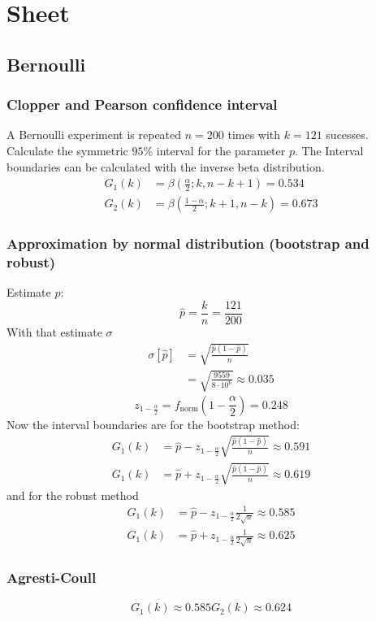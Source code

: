 \section{Sheet}
\subsection{Bernoulli}
\subsubsection{Clopper and Pearson confidence interval}
A Bernoulli experiment is repeated $n=200$ times with $k=121$ sucesses. Calculate the symmetric $95\%$ interval
for the  parameter $p$.
The Interval boundaries can be calculated with the inverse beta distribution.
\begin{align}
    G_1\left(k\right)&=\beta\left(\frac{\alpha}{2};k,n-k+1\right)=0.534
    \\G_2\left(k\right)&=\beta\left(\frac{1-\alpha}{2};k+1,n-k\right)=0.673
\end{align}
\subsubsection{Approximation by normal distribution (bootstrap and robust)}
Estimate $p$:
\begin{equation}
    \hat{p}=\frac{k}{n}=\frac{121}{200}
\end{equation}
With that estimate $\sigma$
\begin{align}
    \sigma\left[\hat{p}\right]&=\sqrt{\frac{\hat{p}\left(1-\hat{p}\right)}{n}}
    \\&=\sqrt{\frac{9559}{8\cdot 10^6}}\approx 0.035
\end{align}
\begin{equation}
    z_{1-\frac{\alpha}{2}}=f_{\text{norm}}\left(1-\frac{\alpha}{2}\right)=0.248
\end{equation}
Now the interval boundaries are for the bootstrap method:
\begin{align}
    G_1\left(k\right)&=\hat{p}-z_{1-\frac{\alpha}{2}}\sqrt{\frac{\hat{p}\left(1-\hat{p}\right)}{n}}\approx 0.591
    \\G_1\left(k\right)&=\hat{p}+z_{1-\frac{\alpha}{2}}\sqrt{\frac{\hat{p}\left(1-\hat{p}\right)}{n}}\approx 0.619
\end{align}
and for the robust method
\begin{align}
    G_1\left(k\right)&=\hat{p}-z_{1-\frac{\alpha}{2}}\frac{1}{2\sqrt{n}}\approx 0.585
    \\G_1\left(k\right)&=\hat{p}+z_{1-\frac{\alpha}{2}}\frac{1}{2\sqrt{n}}\approx 0.625
\end{align}
\subsubsection{Agresti-Coull}
\begin{align}
    G_1\left(k\right)\approx 0.585
    G_2\left(k\right)\approx 0.624
\end{align}
\subsection{}
